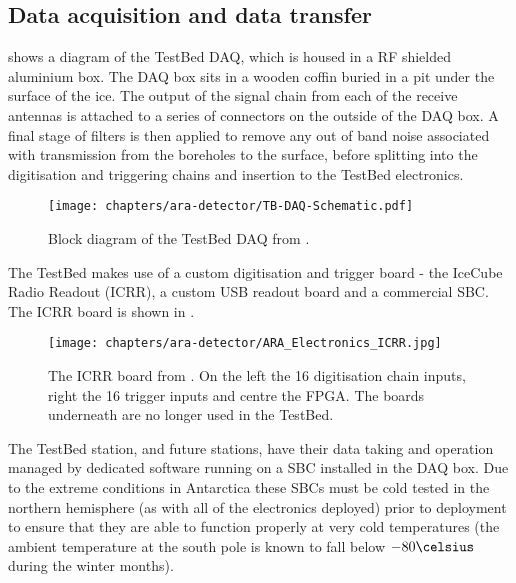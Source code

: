 \subsection{Data acquisition and data transfer}
\label{sec:ara-detector:TestBed:Data-Acquisition}

 shows a diagram of the TestBed DAQ, which is housed in a RF shielded aluminium box. The DAQ box sits in a wooden coffin buried in a pit under the surface of the ice. The output of the signal chain from each of the receive antennas is attached to a series of connectors on the outside of the DAQ box. A final stage of filters is then applied to remove any out of band noise associated with transmission from the boreholes to the surface, before splitting into the digitisation and triggering chains and insertion to the TestBed electronics.

\begin{figure}[htpb]
  \centering
  \texttt{[image: chapters/ara-detector/TB-DAQ-Schematic.pdf]}
  \caption{Block diagram of the TestBed DAQ from \cite{Allison2012457}.}
  \label{fig:ara-detector:TestBed:DAQ-Schematic}
\end{figure}


The TestBed makes use of a custom digitisation and trigger board - the IceCube Radio Readout (ICRR), a custom USB readout board and a commercial SBC. The ICRR board is shown in .

\begin{figure}[htpb]
  \centering
  \texttt{[image: chapters/ara-detector/ARA\_Electronics\_ICRR.jpg]}
  \caption{The ICRR board from \cite{2011ICRC....4..350A}. On the left the 16 digitisation chain inputs, right the 16 trigger inputs and centre the FPGA. The boards underneath are no longer used in the TestBed.}
  \label{fig:ara-detector:TestBed:ICRR}
\end{figure}

The TestBed station, and future stations, have their data taking and operation managed by dedicated software running on a SBC installed in the DAQ box. Due to the extreme conditions in Antarctica these SBCs must be cold tested in the northern hemisphere (as with all of the electronics deployed) prior to deployment to ensure that they are able to function properly at very cold temperatures (the ambient temperature at the south pole is known to fall below $-80 \celsius $ during the winter months).

